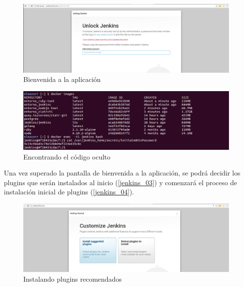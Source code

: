 \begin{figure}[htbp]
	\centering
	\includegraphics[width=1.0\linewidth]
	{desarrollo/figuras/jenkins_01.png}
	\caption{Bienvenida a la aplicación}
	\label{jenkins_01}
\end{figure}


\begin{figure}[htbp]
	\centering
	\includegraphics[width=1.0\linewidth]
	{desarrollo/figuras/jenkins_02.png}
	\caption{Encontrando el código oculto}
	\label{jenkins_02}
\end{figure}

Una vez superado la pantalla de bienvenida a la aplicación, se podrá decidir los plugins que serán instalados al inicio (\autoref{jenkins_03}) y comenzará el proceso de instalación inicial de plugins (\autoref{jenkins_04}).


\begin{figure}[htbp]
	\centering
	\includegraphics[width=1.0\linewidth]
	{desarrollo/figuras/jenkins_03.png}
	\caption{Instalando plugins recomendados}
	\label{jenkins_03}
\end{figure}

